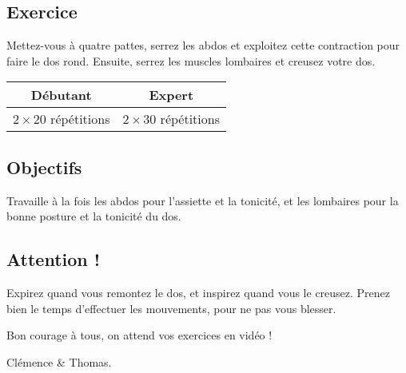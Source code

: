 \documentclass[12pt,a4paper]{article}
\subtitle{Fiche \no 6 -- Dos creux / Dos rond}
\begin{document}
\maketitle




\subsection*{Exercice}
	Mettez-vous à quatre pattes, serrez les abdos et exploitez cette contraction pour faire le dos rond. Ensuite, serrez les muscles lombaires et creusez votre dos.

	\begin{center}
		\begin{tabular}{c|c}
			\textbf{Débutant} & \textbf{Expert} \\
			\hline
			$2 \times 20$ répétitions & $2 \times 30$ répétitions \\
		\end{tabular}
	\end{center}

\subsection*{Objectifs}
	Travaille à la fois les abdos pour l'assiette et la tonicité, et les lombaires pour la bonne posture et la tonicité du dos.

\subsection*{Attention !}
	Expirez quand vous remontez le dos, et inspirez quand vous le creusez. Prenez bien le temps d'effectuer les mouvements, pour ne pas vous blesser.

\vfill
\begin{flushright}
	Bon courage à tous, on attend vos exercices en vidéo ! \phantom{Clémence et Thomas}

	Clémence \& Thomas.
\end{flushright}
\end{document}
